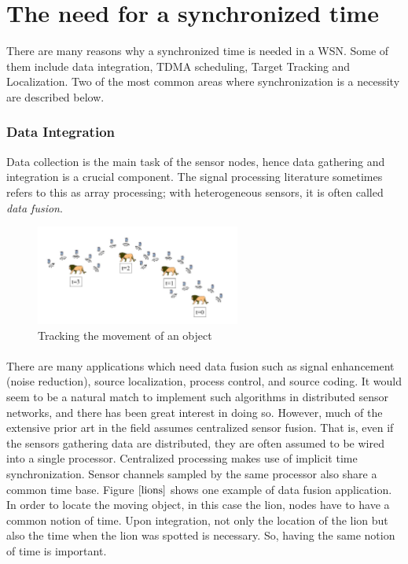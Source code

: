 \documentclass[a4paper,10pt]{report}
\begin{document}
\section{\textbf{The need for a synchronized time}}
There are many reasons why a synchronized time is needed in a WSN. Some of them include data integration, TDMA scheduling, Target
Tracking and Localization. Two of the most common areas where synchronization is a necessity are described below.
\subsubsection{Data Integration}
Data collection is the main task of the sensor nodes, hence data gathering and integration is a crucial component. The signal processing literature sometimes refers to this as array processing; with heterogeneous sensors, it is often called \textit{data fusion}.
\begin{figure}
\centering
\includegraphics[width= 0.6\textwidth]{lions}
\caption{Tracking the movement of an object}
\label{lions}
\end{figure}
\paragraph*{}
There are many applications which need data fusion such as signal enhancement (noise reduction), source localization, process control,
and source coding. It would seem to be a natural match to implement such algorithms in distributed sensor networks, and there has been
great interest in doing so. However, much of the extensive prior art in the field assumes centralized sensor fusion. That is, even if the
sensors gathering data are distributed, they are often assumed to be wired into a single processor. Centralized processing makes use of
implicit time synchronization. Sensor channels sampled by the same processor also share a common time base. Figure $\ref{lions}$ shows
one example of data fusion application. In order to locate the moving object, in this case the lion, nodes have to have a common
notion of time. Upon integration, not only the location of the lion but also the time when the lion was spotted is necessary. So, having
the same notion of time is important.
\end{document}
